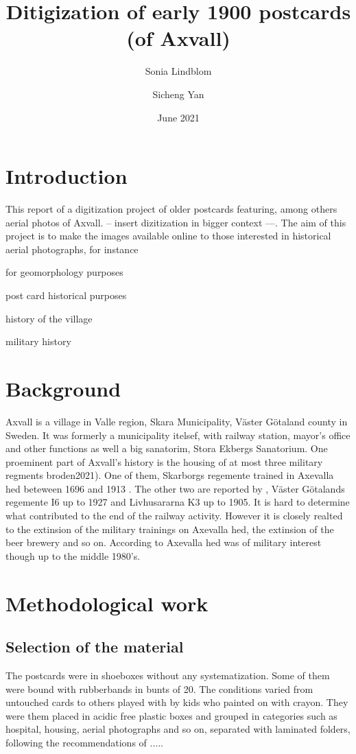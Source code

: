 \documentclass[12 pt]{paper}
\title{%
Ditigization of early 1900 postcards (of Axvall)  }
\author{Sonia Lindblom \and Sicheng Yan}
\date{June 2021}
\begin{document}


\section{Introduction}
This report of a digitization project of older postcards featuring, among others aerial photos of Axvall. -- insert dizitization in  bigger context ---. The aim of this project is to make the images available online to those interested in historical aerial photographs, for instance 
\begin{inparaenum}[i)]
	\item for geomorphology purposes \autocite[cf.][]{gomez2015}
	\item post card historical purposes
	\item history of the village
	\item military history
\end{inparaenum}
\section{Background}
Axvall is a village in Valle region, Skara Municipality, Väster Götaland county in Sweden. It was formerly a municipality itelsef, with railway station, mayor's office and other functions as well a big sanatorim, Stora Ekbergs Sanatorium. One proeminent part of Axvall's history is the housing of at most three military regments \autocite[]{broden2021} broden2021). One of them, Skarborgs regemente trained in Axevalla hed beteween 1696 and 1913 \autocite{frykmer1992}. The other two are reported by \textcite{broden2021}, Väster Götalands regemente I6 up to 1927 and Livhusararna K3 up to 1905. It is hard to determine what contributed to the end of the railway activity. However it is closely realted to the extinsion of the military trainings on Axevalla hed, the extinsion of the beer brewery and so on. According to \textcite[]{broden2021} Axevalla hed was of military interest though up to the middle 1980's.

\section{Methodological work}%
\subsection{Selection of the material}

The postcards were in shoeboxes without any systematization. Some of them were bound with rubberbands in bunts of 20. The conditions varied from untouched cards to others played with by kids who painted on with crayon. They were them placed in acidic free plastic boxes and grouped in categories such as hospital, housing, aerial photographs and so on, separated with laminated folders, following the recommendations of ..... 
 
\end{document}
